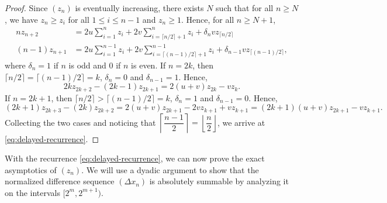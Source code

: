 \begin{proof}
  Since $(z_n)$ is eventually increasing, there exists $N$ such that for all $n\ge N$, we have $z_n \ge z_i$ for all $1\le i \le n-1$ and $z_n \ge 1$. Hence, for all $n\ge N+1$,
  \begin{align*}
    nz_{n+2}     & = 2u\sum_{i=1}^n z_i + 2v\sum_{i=\lceil n/2\rceil+1}^n z_i + \delta_nvz_{\lceil n/2\rceil}                      \\
    (n-1)z_{n+1} & = 2u\sum_{i=1}^{n-1} z_i + 2v\sum_{i=\lceil (n-1)/2\rceil+1}^{n-1} z_i + \delta_{n-1}vz_{\lceil (n-1)/2\rceil},
  \end{align*}
  where $\delta_n = 1$ if $n$ is odd and $0$ if $n$ is even. If $n=2k$, then $\lceil n/2\rceil = \lceil (n-1)/2\rceil = k$, $\delta_n = 0$ and $\delta_{n-1} = 1$. Hence,
  $$2kz_{2k+2} - (2k-1)z_{2k+1} = 2(u+v)z_{2k} - vz_{k}.$$
  If $n=2k+1$, then $\lceil n/2\rceil > \lceil (n-1)/2\rceil = k$, $\delta_n = 1$ and $\delta_{n-1} = 0$. Hence,
  $$(2k+1)z_{2k+3} - (2k)z_{2k+2} = 2(u+v)z_{2k+1} - 2vz_{k+1} + vz_{k+1} = (2k+1)(u+v)z_{2k+1} - vz_{k+1}.$$
  Collecting the two cases and noticing that $\left\lceil\dfrac{n-1}{2}\right\rceil = \left\lfloor\dfrac{n}{2}\right\rfloor$, we arrive at \eqref{eq:delayed-recurrence}.
\end{proof}

With the recurrence \eqref{eq:delayed-recurrence}, we can now prove the exact asymptotics of $(z_n)$. We will use a dyadic argument to show that the normalized difference sequence $(\Delta x_n)$ is absolutely summable by analyzing it on the intervals $[2^m, 2^{m+1})$.


